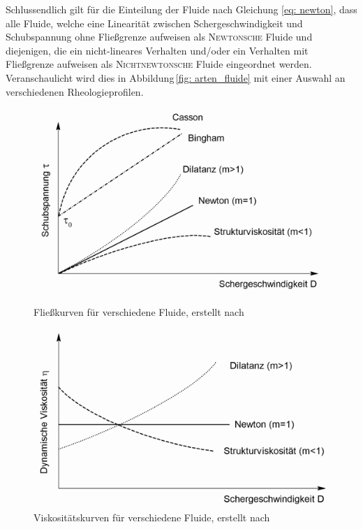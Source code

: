 Schlussendlich gilt für die Einteilung der Fluide nach Gleichung \eqref{eq: newton}, dass alle Fluide, welche eine Linearität zwischen Schergeschwindigkeit und Schubspannung ohne Fließgrenze aufweisen als \textsc{Newtonsche} Fluide und diejenigen, die ein nicht-lineares Verhalten und/oder ein Verhalten mit Fließgrenze aufweisen als \textsc{Nichtnewtonsche} Fluide eingeordnet werden. Veranschaulicht wird dies in Abbildung\,\ref{fig: arten_fluide} mit einer Auswahl an verschiedenen Rheologieprofilen.

\begin{figure}[h!]
	\begin{minipage}[b]{0.475\textwidth}
		\centering
		\includegraphics[width=\textwidth]{img/fluidarten}
		\caption{Fließkurven für verschiedene \linebreak Fluide, erstellt nach \cite{Holze.2010}}
		\label{fig: arten_fluide}
	\end{minipage}
	\hspace*{0.05\textwidth}
	\begin{minipage}[b]{0.475\textwidth}
		\centering
		\includegraphics[width=\textwidth]{img/fluidarten2}
		\caption{Viskositätskurven für verschiedene Fluide, erstellt nach \cite{MunzingChemieGmbH.2018}}
		\label{fig: arten_fluide2}
	\end{minipage}
\end{figure}
\FloatBarrier

